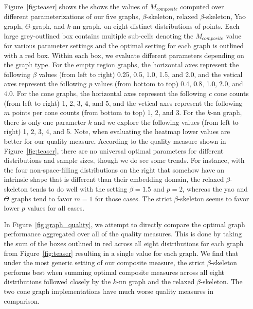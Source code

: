 Figure~\ref{fig:teaser} shows the shows the values of $M_{composite}$ computed over different parameterizations of our five graphs, $\beta$-skeleton, relaxed $\beta$-skeleton, Yao graph, $\Theta$-graph, and $k$-nn graph, on eight distinct distributions of points.
%
Each large grey-outlined box contains multiple sub-cells denoting the $M_{composite}$ value for various parameter settings and the optimal setting for each graph is outlined with a red box.
%
Within each box, we evaluate different parameters depending on the graph type.
%
For the empty region graphs, the horizontal axes represent the following $\beta$ values (from left to right)  0.25, 0.5, 1.0, 1.5, and 2.0, and the vetical axes represent the following $p$ values (from bottom to top) 0.4, 0.8, 1.0, 2.0, and 4.0.
%
For the cone graphs, the horizontal axes represent the following $c$ cone counts (from left to right) 1, 2, 3, 4, and 5, and the vetical axes represent the following $m$ points per cone counts (from bottom to top) 1, 2, and 3.
%
For the $k$-nn graph, there is only one parameter $k$ and we explore the following values (from left to right)  1, 2, 3, 4, and 5.
%
Note, when evaluating the heatmap lower values are better for our quality measure.
%
According to the quality measure shown in Figure~\ref{fig:teaser}, there are no universal optimal parameters for different distributions and sample sizes, though we do see some trends.
%
For instance, with the four non-space-filling distributions on the right that somehow have an intrinsic shape that is different than their embedding domain, the relaxed $\beta$-skeleton tends to do well with the setting $\beta=1.5$ and $p=2$, whereas the yao and $\Theta$ graphs tend to favor $m=1$ for those cases.
%
The strict $\beta$-skeleton seems to favor lower $p$ values for all cases.

In Figure~\ref{fig:graph_quality}, we attempt to directly compare the optimal graph performance aggregated over all of the quality measures.
%
This is done by taking the sum of the boxes outlined in red across all eight distributions for each graph from Figure~\ref{fig:teaser} resulting in a single value for each graph.
%
We find that under the most generic setting of our composite measure, the strict $\beta$-skeleton performs best when summing optimal composite measures across all eight distributions followed closely by the $k$-nn graph and the relaxed $\beta$-skeleton.
%
The two cone graph implementations have much worse quality measures in comparison.

